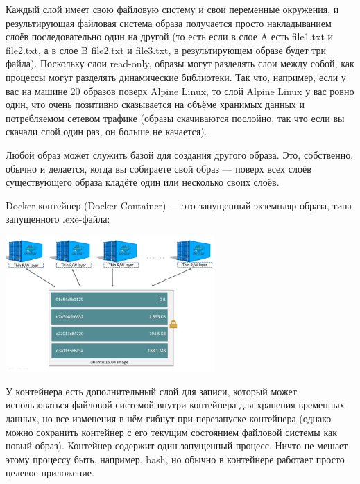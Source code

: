 \documentclass{../text-style}
\begin{document}
Каждый слой имеет свою файловую систему и свои переменные окружения, и результирующая файловая система образа получается просто накладыванием слоёв последовательно один на другой (то есть если в слое A есть file1.txt и file2.txt, а в слое B file2.txt и file3.txt, в результирующем образе будет три файла). Поскольку слои read-only, образы могут разделять слои между собой, как процессы могут разделять динамические библиотеки. Так что, например, если у вас на машине 20 образов поверх Alpine Linux, то слой Alpine Linux у вас ровно один, что очень позитивно сказывается на объёме хранимых данных и потребляемом сетевом трафике (образы скачиваются послойно, так что если вы скачали слой один раз, он больше не качается).

Любой образ может служить базой для создания другого образа. Это, собственно, обычно и делается, когда вы собираете свой образ --- поверх всех слоёв существующего образа кладёте один или несколько своих слоёв.

Docker-контейнер (Docker Container) --- это запущенный экземпляр образа, типа запущенного .exe-файла:

\begin{center}
    \includegraphics[width=0.6\textwidth]{dockerContainer.png}
\end{center}

У контейнера есть дополнительный слой для записи, который может использоваться файловой системой внутри контейнера для хранения временных данных, но все изменения в нём гибнут при перезапуске контейнера (однако можно сохранить контейнер с его текущим состоянием файловой системы как новый образ). Контейнер содержит один запущенный процесс. Ничто не мешает этому процессу быть, например, bash, но обычно в контейнере работает просто целевое приложение.
\end{document}
